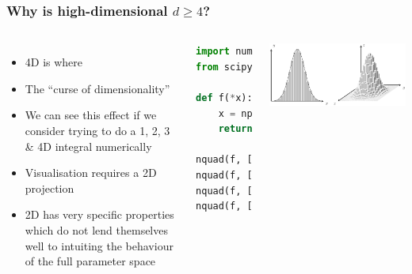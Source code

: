 \documentclass[aspectratio=169]{beamer}
\begin{document}
\begin{frame}[fragile]
    \frametitle{Why is high-dimensional $d\ge4$?}
    \begin{columns}
        \begin{itemize}
            \item 4D is where 
            \item The ``curse of dimensionality''
            \item We can see this effect if we consider trying to do a 1, 2, 3 \& 4D integral numerically

            \item Visualisation requires a 2D projection
            \item 2D has very specific properties which do not lend themselves well to intuiting the behaviour of the full parameter space
        \end{itemize}
    \begin{lstlisting}[language=Python]
import numpy as np
from scipy.integrate import nquad

def f(*x):
    x = np.array([*x])
    return np.exp(-(x**2).sum())

nquad(f, [[-5, 5]])     # 322  micro s
nquad(f, [[-5, 5]] * 2) # 33.4 ms
nquad(f, [[-5, 5]] * 3) # 3.4  s 
nquad(f, [[-5, 5]] * 4) # ...
    \end{lstlisting}
        \includegraphics[width=\textwidth]{figures/integration.pdf}
    \end{columns}
    
\end{frame}
\end{document}
